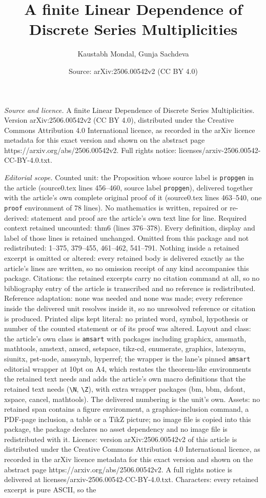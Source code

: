 \documentclass[10pt,a4paper]{amsart}
\title[A finite Linear Dependence of Discrete Series Multiplicities]{A finite Linear Dependence of Discrete Series Multiplicities}
\author{Kaustabh Mondal, Gunja Sachdeva}
\date{Source: arXiv:2506.00542v2 (CC BY 4.0)}
\begin{document}
\maketitle

\noindent\emph{Source and licence.} A finite Linear Dependence of Discrete Series Multiplicities. Version arXiv:2506.00542v2 (CC BY 4.0), distributed under the Creative Commons Attribution 4.0 International licence, as recorded in the arXiv licence metadata for this exact version and shown on the abstract page https://arxiv.org/abs/2506.00542v2. Full rights notice: licenses/arxiv-2506.00542-CC-BY-4.0.txt.\par\smallskip

\noindent\textit{Editorial scope.} Counted unit: the Proposition whose source label is \texttt{propgen} in the article (source0.tex lines 456--460, source label \texttt{propgen}), delivered together with the article's own complete original proof of it (source0.tex lines 463--540, one \texttt{proof} environment of 78 lines). No mathematics is written, repaired or re-derived: statement and proof are the article's own text line for line. Required context retained uncounted: thm6 (lines 376--378). Every definition, display and label of those lines is retained unchanged. Omitted from this package and not redistributed: 1--375, 379--455, 461--462, 541--791. Nothing inside a retained excerpt is omitted or altered: every retained body is delivered exactly as the article's lines are written, so no omission receipt of any kind accompanies this package. Citations: the retained excerpts carry no citation command at all, so no bibliography entry of the article is transcribed and no reference is redistributed. Reference adaptation: none was needed and none was made; every reference inside the delivered unit resolves inside it, so no unresolved reference or citation is produced. Printed slips kept literal: no printed word, symbol, hypothesis or number of the counted statement or of its proof was altered. Layout and class: the article's own class is \texttt{amsart} with packages including graphicx, amsmath, mathtools, amstext, amscd, setspace, tikz-cd, enumerate, graphics, latexsym, siunitx, pst-node, amssymb, hyperref; the wrapper is the lane's pinned \texttt{amsart} editorial wrapper at 10pt on A4, which restates the theorem-like environments the retained text needs and adds the article's own macro definitions that the retained text needs (\texttt{\textbackslash N}, \texttt{\textbackslash Z}), with extra wrapper packages (bm, bbm, dsfont, xspace, cancel, mathtools). The delivered numbering is the unit's own. Assets: no retained span contains a figure environment, a graphics-inclusion command, a PDF-page inclusion, a table or a TikZ picture; no image file is copied into this package, the package declares no asset dependency and no image file is redistributed with it. Licence: version arXiv:2506.00542v2 of this article is distributed under the Creative Commons Attribution 4.0 International licence, as recorded in the arXiv licence metadata for this exact version and shown on the abstract page https://arxiv.org/abs/2506.00542v2. A full rights notice is delivered at licenses/arxiv-2506.00542-CC-BY-4.0.txt. Characters: every retained excerpt is pure ASCII, so the 
\end{document}
